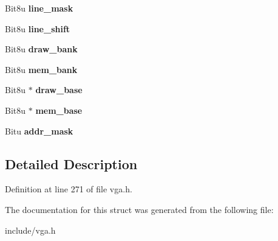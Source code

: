 \begin{DoxyCompactItemize}
\item 
\hypertarget{structVGA__TANDY_ac11ab0eacb74d36a4a3dd6aaf37a686f}{Bit8u {\bfseries line\-\_\-mask}}\label{structVGA__TANDY_ac11ab0eacb74d36a4a3dd6aaf37a686f}

\item 
\hypertarget{structVGA__TANDY_ae12c0fcf6c249e111c6234f01b8cf248}{Bit8u {\bfseries line\-\_\-shift}}\label{structVGA__TANDY_ae12c0fcf6c249e111c6234f01b8cf248}

\item 
\hypertarget{structVGA__TANDY_a5b6d47ade55349d0a33eb63e54395287}{Bit8u {\bfseries draw\-\_\-bank}}\label{structVGA__TANDY_a5b6d47ade55349d0a33eb63e54395287}

\item 
\hypertarget{structVGA__TANDY_a7387ac0d3b061d599ce1afe53910beef}{Bit8u {\bfseries mem\-\_\-bank}}\label{structVGA__TANDY_a7387ac0d3b061d599ce1afe53910beef}

\item 
\hypertarget{structVGA__TANDY_a3e2211caf88d83cc8288bed2fa5fa0af}{Bit8u $\ast$ {\bfseries draw\-\_\-base}}\label{structVGA__TANDY_a3e2211caf88d83cc8288bed2fa5fa0af}

\item 
\hypertarget{structVGA__TANDY_a5e9ff0bd5345f4fb3e7e9e6e5bd2ccad}{Bit8u $\ast$ {\bfseries mem\-\_\-base}}\label{structVGA__TANDY_a5e9ff0bd5345f4fb3e7e9e6e5bd2ccad}

\item 
\hypertarget{structVGA__TANDY_a844355a014b601bccd7728ccc140935e}{Bitu {\bfseries addr\-\_\-mask}}\label{structVGA__TANDY_a844355a014b601bccd7728ccc140935e}

\end{DoxyCompactItemize}


\subsection{Detailed Description}


Definition at line 271 of file vga.\-h.



The documentation for this struct was generated from the following file\-:\begin{DoxyCompactItemize}
\item 
include/vga.\-h\end{DoxyCompactItemize}
